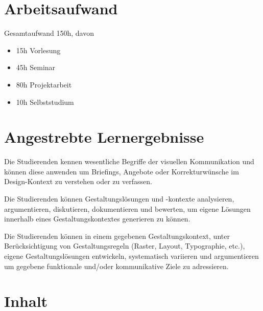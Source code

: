 \hypertarget{arbeitsaufwandpathlabel....srcmodulbeschreibungen-bachelor-bpo5ba_screendesign}{%
\section*{Arbeitsaufwand\label{../../src/modulbeschreibungen-bachelor-bpo5/BA_Screendesign}}\label{arbeitsaufwandpathlabel....srcmodulbeschreibungen-bachelor-bpo5ba_screendesign}}

Gesamtaufwand 150h, davon

\begin{itemize}
\tightlist
\item
  15h Vorlesung
\item
  45h Seminar
\item
  80h Projektarbeit
\item
  10h Selbststudium
\end{itemize}

\hypertarget{angestrebte-lernergebnissepathlabel....srcmodulbeschreibungen-bachelor-bpo5ba_screendesign}{%
\section*{Angestrebte
Lernergebnisse\label{../../src/modulbeschreibungen-bachelor-bpo5/BA_Screendesign}}\label{angestrebte-lernergebnissepathlabel....srcmodulbeschreibungen-bachelor-bpo5ba_screendesign}}

Die Studierenden kennen wesentliche Begriffe der visuellen Kommunikation
und können diese anwenden um Briefings, Angebote oder Korrekturwünsche
im Design-Kontext zu verstehen oder zu verfassen.

Die Studierenden können Gestaltungslösungen und -kontexte analysieren,
argumentieren, diskutieren, dokumentieren und bewerten, um eigene
Lösungen innerhalb eines Gestaltungskontextes generieren zu können.

Die Studierenden können in einem gegebenen Gestaltungskontext, unter
Berücksichtigung von Gestaltungsregeln (Raster, Layout, Typographie,
etc.), eigene Gestaltungslösungen entwickeln, systematisch variieren und
argumentieren um gegebene funktionale und/oder kommunikative Ziele zu
adressieren.

\hypertarget{inhaltpathlabel....srcmodulbeschreibungen-bachelor-bpo5ba_screendesign}{%
\section*{Inhalt\label{../../src/modulbeschreibungen-bachelor-bpo5/BA_Screendesign}}\label{inhaltpathlabel....srcmodulbeschreibungen-bachelor-bpo5ba_screendesign}}

